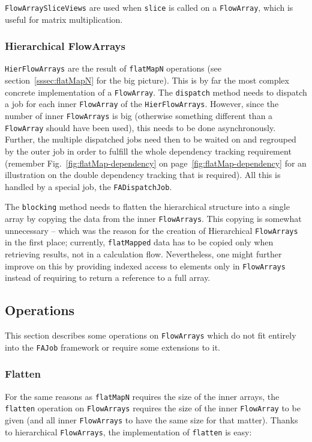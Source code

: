 \documentclass[runningheads,a4paper,fleqn]{llncs}
\begin{document}
\texttt{FlowArraySliceViews} are used when \texttt{slice} is called on
a \texttt{FlowArray}, which is useful for matrix multiplication.

\subsubsection{Hierarchical FlowArrays}
\texttt{HierFlowArrays} are the result of \texttt{flatMapN} operations
(see section~\ref{sssec:flatMapN} for the big picture). This is by far
the most complex concrete implementation of a \texttt{FlowArray}. The
\texttt{dispatch} method needs to dispatch a job for each inner
\texttt{FlowArray} of the \texttt{HierFlowArrays}. However, since the number of
inner \texttt{FlowArrays} is big (otherwise something different than a \texttt{FlowArray}
should have been used), 
this needs to be done asynchronously. Further, the multiple dispatched
jobs need then to be waited on and regrouped by the outer job in order
to fulfill the whole dependency tracking requirement (remember
Fig.~\ref{fig:flatMap-dependency} on
page~\ref{fig:flatMap-dependency} for an illustration on the
double dependency tracking that is required). All this is handled by a 
special job, the \texttt{FADispatchJob}.

The \texttt{blocking} method needs to flatten the hierarchical
structure into a single array by copying the data from the inner
\texttt{FlowArrays}. This copying is somewhat unnecessary -- which 
was the reason for the creation of Hierarchical \texttt{FlowArrays} in the
first place; currently, \texttt{flatMapped} data has to be copied only when
retrieving results, not in a calculation flow. Nevertheless, one might
further improve on this by providing indexed access to elements only
in \texttt{FlowArrays} instead of requiring to return a reference to a full
array.

\subsection{Operations}
\label{ssec:imp-operations}
This section describes some operations on \texttt{FlowArrays} which do not fit
entirely into the \texttt{FAJob} framework or require some extensions
to it.

\subsubsection{Flatten}
For the same reasons as \texttt{flatMapN} requires the size of the
inner arrays, the \texttt{flatten} operation on \texttt{FlowArrays} requires
the size of the inner \texttt{FlowArray} to be given (and all inner \texttt{FlowArrays}
to have the same size for that matter). Thanks to hierarchical
\texttt{FlowArrays}, the implementation of \texttt{flatten} is easy:
\end{document}
